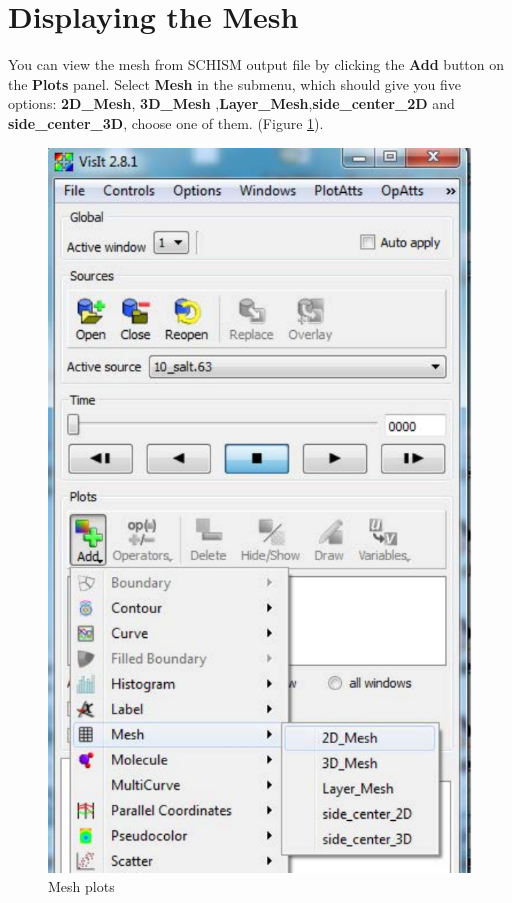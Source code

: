 \documentclass[12pt]{report}
\begin{document}
 \section{Displaying the Mesh}
You can view the mesh from SCHISM output file by clicking the {\bf Add} button on the {\bf Plots} panel. Select {\bf Mesh} 
in the submenu, which should give you five options: {\bf 2D\_Mesh}, {\bf 3D\_Mesh} ,{\bf Layer\_Mesh},{\bf side\_center\_2D} and
{\bf side\_center\_3D}, choose one of them.
(Figure \ref{figure:meshItems}).  
        \begin{figure}
        \begin{center}
        \includegraphics{meshItems}
        \caption{Mesh plots}
        \label{figure:meshItems}
        \end{center}
        \end{figure}
				
\end{document}
